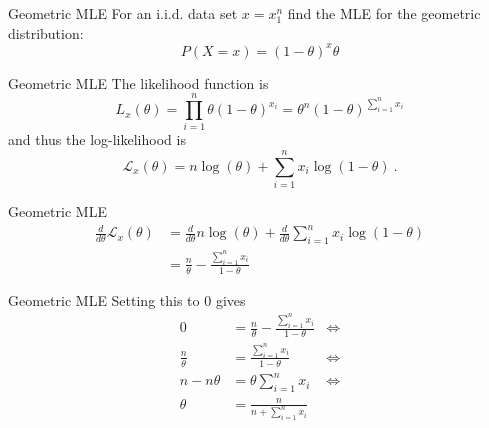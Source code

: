 \documentclass[14pt]{beamer}
\begin{document}
\begin{frame}{Geometric MLE}
For an i.i.d. data set $ x = x_{1}^{n} $ find the MLE for the geometric distribution:
$$ P(X=x) = (1-\theta)^{x}\theta $$
\end{frame}

\begin{frame}{Geometric MLE}
The likelihood function is
$$ L_{x}(\theta) = \prod_{i=1}^{n} \theta(1-\theta)^{x_{i}} = \theta^{n} (1-\theta)^{\sum_{i=1}^{n}x_{i}} $$
and thus the log-likelihood is
$$ \mathcal{L}_{x}(\theta) = n\log(\theta) + \sum_{i=1}^{n}x_{i}\log(1-\theta) \ . $$
\end{frame}

\begin{frame}{Geometric MLE}
\begin{align*}
\frac{d}{d\theta}\mathcal{L}_{x}(\theta) &= \frac{d}{d\theta}n\log(\theta) + \frac{d}{d\theta}\sum_{i=1}^{n}x_{i}\log(1-\theta) \\
&= \frac{n}{\theta} - \frac{\sum_{i=1}^{n}x_{i}}{1-\theta}
\end{align*}
\end{frame}

\begin{frame}{Geometric MLE}
Setting this to 0 gives
\begin{align*}
0 &= \frac{n}{\theta} - \frac{\sum_{i=1}^{n}x_{i}}{1-\theta} &\Leftrightarrow \\
\frac{n}{\theta} &= \frac{\sum_{i=1}^{n}x_{i}}{1-\theta} &\Leftrightarrow \\
n - n\theta &= \theta \sum_{i=1}^{n}x_{i} &\Leftrightarrow \\
\theta &= \frac{n}{n + \sum_{i=1}^{n}x_{i}}&
\end{align*}
\end{frame}
\end{document}
